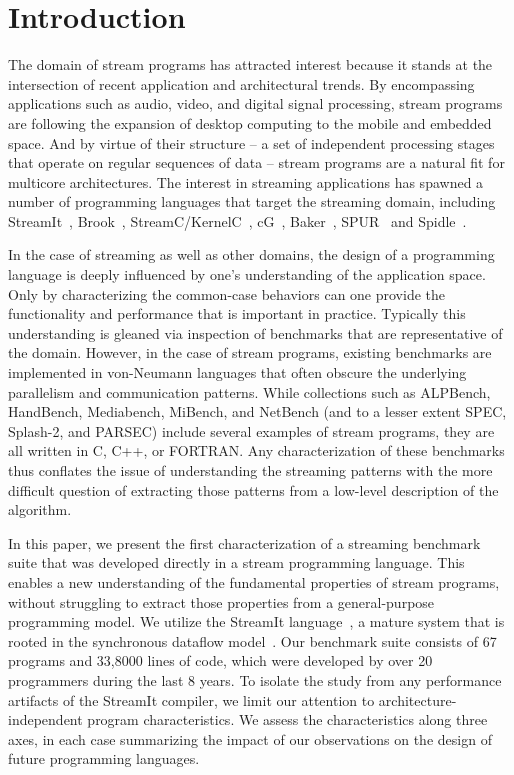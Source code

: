 \section{Introduction}

The domain of stream programs has attracted interest because it stands
at the intersection of recent application and architectural trends.
By encompassing applications such as audio, video, and digital signal
processing, stream programs are following the expansion of desktop
computing to the mobile and embedded space.  And by virtue of their
structure -- a set of independent processing stages that operate on
regular sequences of data -- stream programs are a natural fit for
multicore architectures.  The interest in streaming applications has
spawned a number of programming languages that target the streaming
domain, including StreamIt~\cite{thies-cc02}, Brook~\cite{brook04},
StreamC/KernelC~\cite{imagine03ieee}, cG~\cite{cg03},
Baker~\cite{Baker}, SPUR~\cite{spur05samos} and
Spidle~\cite{spidle03}.

In the case of streaming as well as other domains, the design of a
programming language is deeply influenced by one's understanding of
the application space.  Only by characterizing the common-case
behaviors can one provide the functionality and performance that is
important in practice.  Typically this understanding is gleaned via
inspection of benchmarks that are representative of the domain.
However, in the case of stream programs, existing benchmarks are
implemented in von-Neumann languages that often obscure the underlying
parallelism and communication patterns.  While collections such as
ALPBench, HandBench, Mediabench, MiBench, and NetBench (and to a
lesser extent SPEC, Splash-2, and PARSEC) include several examples of
stream programs, they are all written in C, C++, or FORTRAN.  Any
characterization of these benchmarks thus conflates the issue of
understanding the streaming patterns with the more difficult question
of extracting those patterns from a low-level description of the
algorithm.

In this paper, we present the first characterization of a streaming
benchmark suite that was developed directly in a stream programming
language.  This enables a new understanding of the fundamental
properties of stream programs, without struggling to extract those
properties from a general-purpose programming model.  We utilize the
StreamIt language~\cite{thies-cc02}, a mature system that is rooted in
the synchronous dataflow model~\cite{lee87}.  Our benchmark suite
consists of 67 programs and 33,8000 lines of code, which were
developed by over 20 programmers during the last 8 years.  To isolate
the study from any performance artifacts of the StreamIt compiler, we
limit our attention to architecture-independent program
characteristics.  We assess the characteristics along three axes, in
each case summarizing the impact of our observations on the design of
future programming languages.

